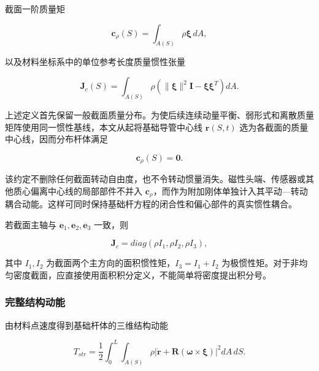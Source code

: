 截面一阶质量矩

\begin{equation}
\label{eq:rod-1-24}
\mathbf{c}_{\rho}(S) = \int_{A(S)}^{}\rho\bm{\xi}\, dA,
\end{equation}

以及材料坐标系中的单位参考长度质量惯性张量

\begin{equation}
\label{eq:rod-1-25}
\mathbf{J}_{c}(S) = \int_{A(S)}^{}\rho\left( \parallel \bm{\xi} \parallel^{2}\mathbf{I} - \bm{\xi}\bm{\xi}^{T} \right)dA.
\end{equation}

上述定义首先保留一般截面质量分布。为使后续连续动量平衡、弱形式和离散质量矩阵使用同一惯性基线，本文从起将基础导管中心线 \(\mathbf{r}(S,t)\) 选为各截面的质量中心线，因而分布杆体满足

\begin{equation}
\label{eq:rod-1-26}
\boxed{\mathbf{c}_{\rho}(S) = \mathbf{0}.}
\end{equation}

该约定不删除任何截面转动自由度，也不令转动惯量消失。磁性头端、传感器或其他质心偏离中心线的局部部件不并入 \(\mathbf{c}_{\rho}\)，而作为附加刚体单独计入其平动---转动耦合动能。这样可同时保持基础杆方程的闭合性和偏心部件的真实惯性耦合。

若截面主轴与 \(\mathbf{e}_{1},\mathbf{e}_{2},\mathbf{e}_{3}\) 一致，则

\begin{equation}
\label{eq:rod-1-27}
\mathbf{J}_{c} = diag\left( \rho I_{1},\rho I_{2},\rho I_{3} \right),
\end{equation}

其中 \(I_{1},I_{2}\) 为截面两个主方向的面积惯性矩，\(I_{3} = I_{1} + I_{2}\) 为极惯性矩。对于非均匀密度截面，应直接使用面积积分定义，不能简单将密度提出积分号。

\subsubsection{完整结构动能}\label{sec:rod-1-3-2}

由材料点速度得到基础杆体的三维结构动能

\begin{equation}
\label{eq:rod-1-28}
T_{str} = \frac{1}{2}\int_{0}^{L}{\int_{A(S)}^{}\rho}\left| \dot{\mathbf{r}} + \mathbf{R}\left( \bm{\omega} \times \bm{\xi} \right) \right|^{2}dA\, dS.
\end{equation}

